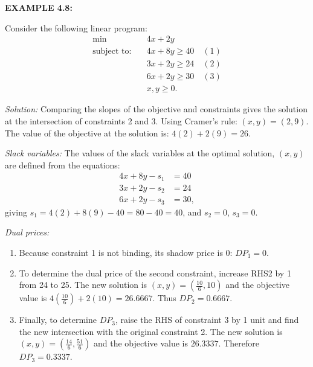 \bigskip
\noindent\textbf{EXAMPLE 4.8:}
\begin{original}
Consider the following linear program:
\[
\begin{aligned}
\min \quad & 4x + 2y \\
\text{subject to:} \quad & 4x + 8y \ge 40 \quad (1) \\
& 3x + 2y \ge 24 \quad (2) \\
& 6x + 2y \ge 30 \quad (3) \\
& x, y \ge 0.
\end{aligned}
\]

\noindent\textit{Solution:} Comparing the slopes of the objective and constraints gives the solution at the intersection of constraints 2 and 3. Using Cramer's rule: $(x, y) = (2,9)$. The value of the objective at the solution is: $4(2) + 2(9) = 26$.

\noindent\textit{Slack variables:} The values of the slack variables at the optimal solution, $(x, y)$ are defined from the equations:
\[
\begin{aligned}
4x + 8y - s_1 &= 40 \\
3x + 2y - s_2 &= 24 \\
6x + 2y - s_3 &= 30,
\end{aligned}
\]
giving $s_1 = 4(2) + 8(9) - 40 = 80 - 40 = 40$, and $s_2 = 0$, $s_3 = 0$.

\noindent\textit{Dual prices:}
\begin{enumerate}
\item Because constraint 1 is not binding, its shadow price is 0: $DP_1 = 0$.
\item To determine the dual price of the second constraint, increase RHS2 by 1 from 24 to 25. The new solution is $(x, y) = \left(\frac{10}{6}, 10\right)$ and the objective value is $4\left(\frac{10}{6}\right) + 2(10) = 26.6667$. Thus $DP_2 = 0.6667$.
\item Finally, to determine $DP_3$, raise the RHS of constraint 3 by 1 unit and find the new intersection with the original constraint 2. The new solution is $(x, y) = \left(\frac{14}{6}, \frac{51}{6}\right)$ and the objective value is $26.3337$. Therefore $DP_3 = 0.3337$.
\end{enumerate}
\end{original}
